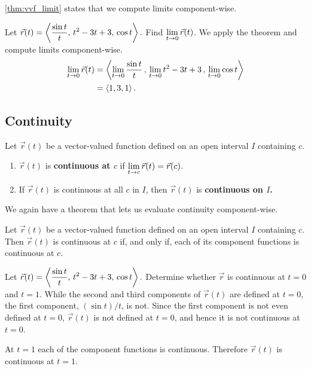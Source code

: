 \autoref{thm:vvf_limit} states that we compute limits component-wise.

\begin{example}\label{ex_vvflimit1}%
Let $\displaystyle\vec r(t) =\left\langle \frac{\sin t}{t},\, t^2-3t+3,\,\cos t\right\rangle.$ Find $\displaystyle \lim_{t\to 0}\vec r(t)$.
\solution
We apply the theorem and compute limits component-wise.
\begin{align*}
\lim_{t\to0} \vec r(t) &=\left\langle \lim_{t\to 0}\frac{\sin t}{t}\, , \, \lim_{t\to 0} t^2-3t+3\, , \, \lim_{t\to 0} \cos t\right\rangle\\
			&=\left\langle 1,3,1\right\rangle.
\end{align*}
\end{example}

\subsection{Continuity}

\begin{definition}\label{def:vvf_continuity}%
Let $\vec r(t)$ be a vector-valued function defined on an open interval $I$ containing $c$.
\begin{enumerate}
	\item $\vec r(t)$ is \textbf{continuous at $c$} if $\displaystyle \lim_{t\to c} \vec r(t) = \vec r(c)$.
	\item	If $\vec r(t)$ is continuous at all $c$ in $I$, then $\vec r(t)$ is \textbf{continuous on $I$.}
\end{enumerate}
\end{definition}

We again have a theorem that lets us evaluate continuity component-wise.

\begin{theorem}\label{thm:vvf_continuity}%
Let $\vec r(t)$ be a vector-valued function defined on an open interval $I$ containing $c$. Then $\vec r(t)$ is continuous at $c$ if, and only if, each of its component functions is continuous at $c$.
\end{theorem}

\begin{example}\label{ex_vvflimit2}%
Let $\displaystyle\vec r(t) =\left\langle \frac{\sin t}{t},\, t^2-3t+3,\,\cos t\right\rangle.$ Determine whether $\vec r$ is continuous at $t=0$ and $t=1$.
\solution
While the second and third components of $\vec r(t)$ are defined at $t=0$, the first component, $(\sin t)/t$, is not. Since the first component is not even defined at $t=0$, $\vec r(t)$ is not defined at $t=0$, and hence it is not continuous at $t=0$.

At $t=1$ each of the component functions is continuous. Therefore $\vec r(t)$ is continuous at $t=1$.
\end{example}

